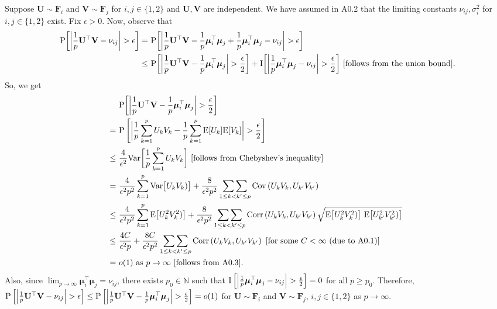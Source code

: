 \documentclass[twoside]{article}
\newcommand{\bF}{\mathbf{F}}
\newcommand{\bU}{\mathbf{U}}
\newcommand{\bV}{\mathbf{V}}
\newcommand{\bmu}{\boldsymbol{\mu}}
\newcommand{\0}{\mathbf{0}}
\newcommand{\1}{\mathbf{1}}
\numberwithin{equation}{section}
\begin{document}
Suppose $\bU\sim\bF_i$ and $\bV\sim\bF_j$ for $i,j\in\{1,2\}$ and $\bU,\bV$ are independent. We have assumed in A0.2 that the limiting constants $\nu_{ij},\sigma^2_i$ for $i,j\in\{1,2\}$ exist. Fix $\epsilon>0$. Now, observe that
\begin{align*}
\ {\rm P}\bigg [\bigg |\frac{1}{p}\bU^\top\bV - \nu_{ij}\bigg |>\epsilon\bigg ]
=&\ {\rm P}\bigg [\bigg |\frac{1}{p}\bU^\top\bV - \frac{1}{p}\bmu_i^\top\bmu_j + \frac{1}{p}\bmu_i^\top\bmu_j - \nu_{ij}\bigg |>\epsilon\bigg ]\\
\leq &\ {\rm P}\bigg [\bigg |\frac{1}{p}\bU^\top\bV - \frac{1}{p}\bmu_i^\top\bmu_j\bigg |>\frac{\epsilon}{2}\bigg ] + {\rm I}\bigg [\bigg |\frac{1}{p}\bmu_i^\top\bmu_j - \nu_{ij}\bigg |>\frac{\epsilon}{2}\bigg ]\ [\text{follows from the union bound}].
\end{align*}
So, we get
\begin{align}\label{ref1}
&\ {\rm P}\bigg [\bigg |\frac{1}{p}\bU^\top\bV - \frac{1}{p}\bmu_i^\top\bmu_j\bigg |>\frac{\epsilon}{2}\bigg ]\\
= &\ {\rm P}\left [\bigg |\frac{1}{p}\sum_{k=1}^p U_{k}V_k - \frac{1}{p}\sum_{k=1}^p {\rm E}[ U_{k}]{\rm E}[V_k]\bigg |>\frac{\epsilon}{2}\right]\nonumber\\
\leq &\ \frac{4}{\epsilon^2}{\rm Var}\bigg [\frac{1}{p}\sum_{k=1}^p U_{k}V_{k}\bigg ]\ [\text{follows from Chebyshev's inequality}]\nonumber \\
=&\ \frac{4}{\epsilon^2 p^2}\sum_{k=1}^p {\rm Var}\big [U_{k}V_{k})\big ]
 +\frac{8}{\epsilon^2 p^2}\mathop{\sum\sum}_{1\leq k< k^\prime\leq p} {\rm Cov}\left(U_{k}V_{k},U_{k^\prime}V_{k^\prime}\right)\nonumber \\
\leq &\ \frac{4}{\epsilon^2 p^2}\sum_{k=1}^p {\rm E}\big [U^2_{k}V^2_{k})\big ]
 +\frac{8}{\epsilon^2 p^2}\mathop{\sum\sum}_{1\leq k< k^\prime\leq p} {\rm Corr}\left(U_{k}V_{k},U_{k^\prime}V_{k^\prime}\right)\sqrt{{\rm E}\big [U^2_{k}V^2_{k})\big ]\ {\rm E}\big [U^2_{k^\prime}V^2_{k^\prime})\big ]}\nonumber \\
 \leq &\ \frac{4C}{\epsilon^2 p}
 +\frac{8C}{\epsilon^2 p^2}\mathop{\sum\sum}_{1\leq k< k^\prime\leq p} {\rm Corr}\left(U_{k}V_{k},U_{k^\prime}V_{k^\prime}\right)\ [\text{for some }C<\infty\ (\text{due to A0.1})]\nonumber \\
 =&\ o(1)\text{ as }p\to\infty\ [\text{follows from A0.3}].
\end{align}
Also, since $\lim_{p\to\infty}\bmu_i^\top\bmu_j=\nu_{ij}$, there exists $p_0\in\mathbb{N}$ such that ${\rm I}\left [\left |\frac{1}{p}\bmu_i^\top\bmu_j - \nu_{ij}\right |>\frac{\epsilon}{2}\right ]=0$ for all $p\geq p_0$. Therefore, ${\rm P}\left [\left |\frac{1}{p}\bU^\top\bV - \nu_{ij}\right |>\epsilon\right ]\leq {\rm P}\left [\left |\frac{1}{p}\bU^\top\bV - \frac{1}{p}\bmu_i^\top\bmu_j\right |>\frac{\epsilon}{2}\right ] =o(1)$ for $\bU\sim\bF_i$ and $\bV\sim\bF_j$, $i,j\in\{1,2\}$ as $p\to\infty$.
\end{document}
